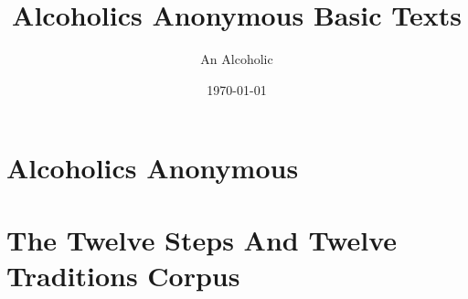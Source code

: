 \documentclass[twopage,twocolumn,10pt]{memoir}
\title{Alcoholics Anonymous Basic Texts}
\author{An Alcoholic}
\date{\today}
\begin{document}
    \frontmatter


    \begin{titlingpage}

        \maketitle

    \end{titlingpage}


    \tableofcontents


    \part*{Alcoholics Anonymous}

    \mainmatter

    
    
    

    
    
    
    




    


    \part*{The Twelve Steps And Twelve Traditions Corpus}


%
\end{document}
